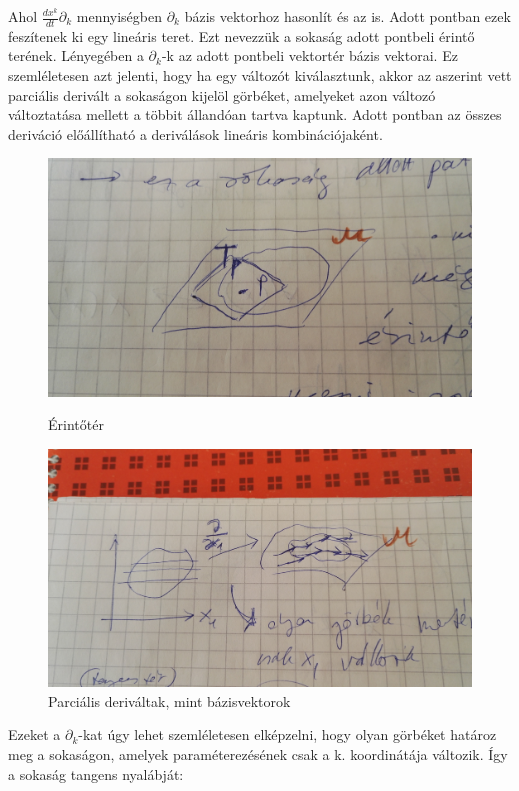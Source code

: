 \documentclass[a4paper,12pt]{article}
\begin{document}
\par Ahol $\frac{dx^{k}}{dt}\partial_{k}$ mennyiségben $\partial_{k}$ bázis vektorhoz hasonlít és az is. Adott pontban ezek feszítenek ki egy lineáris teret. Ezt nevezzük a sokaság adott pontbeli érintő terének. Lényegében a $\partial_{k}$-k az adott pontbeli vektortér bázis vektorai. Ez szemléletesen azt jelenti, hogy ha egy változót kiválasztunk, akkor az aszerint vett parciális derivált a sokaságon kijelöl görbéket, amelyeket azon változó változtatása mellett a többit állandóan tartva kaptunk. Adott pontban az összes deriváció előállítható a deriválások lineáris kombinációjaként.
\begin{figure}[H]
\centering
\begin{minipage}{0.46\linewidth}
\centering
\includegraphics[width=0.9\linewidth]{erintoter.jpg}
\caption{Érintőtér}
\end{minipage}
\begin{minipage}{0.46\linewidth}
\centering
\includegraphics[width=0.9\linewidth]{derivacio.jpg}
\caption{Parciális deriváltak, mint bázisvektorok}
\end{minipage}
\end{figure}
\par Ezeket a $\partial_{k}$-kat úgy lehet szemléletesen elképzelni, hogy olyan görbéket határoz meg a sokaságon, amelyek paraméterezésének csak a k. koordinátája változik. Így a sokaság tangens nyalábját:
\end{document}
